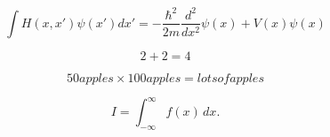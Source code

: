 \documentclass{article}
\begin{document}
{\Large
\begin{displaymath}
 \int H(x,x')\psi(x')dx' = -\frac{\hbar^2}{2m}\frac{d^2}{dx^2}
                          \psi(x)+V(x)\psi(x)
\end{displaymath}

\begin{equation}
 2 + 2 = 4
\end{equation}

\begin{equation}
  50 apples \times 100 apples = lots of apples 
\end{equation}

\begin{equation}
I = \! \int_{-\infty}^\infty f(x)\,dx \label{eq:fine}.
\end{equation}

}
\end{document}
